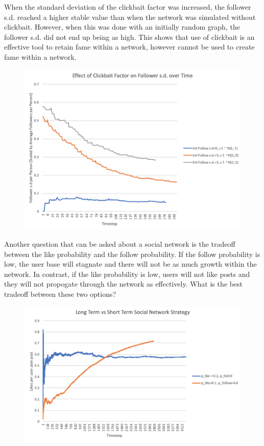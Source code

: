 \documentclass{article}
\begin{document}
When the standard deviation of the clickbait factor was increased, the follower s.d. reached
a higher stable value than when the network was simulated without clickbait.
However, when this was done with an initially random graph, the follower s.d.
did not end up being as high.
This shows that use of clickbait is an effective
tool to retain fame within a network, however cannot be used to
create fame within a network.

\begin{figure}[H]
\centering
\includegraphics[width=.7\linewidth]{follSd}
\end{figure}

Another question that can be asked about a social network is
the tradeoff between the like probability and the follow probability.
If the follow probability is low, the user base will stagnate and there will
not be as much growth within the network.
In contrast, if the like probability is low, users will not like posts
and they will not propogate through the network as effectively.
What is the best tradeoff between these two options?

\begin{figure}[H]
\centering
\includegraphics[width=.7\linewidth]{Growth}
\end{figure}
\end{document}
